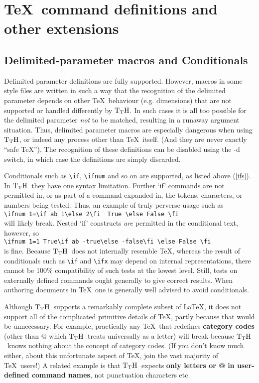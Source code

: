 \documentclass[12pt]{article}
\def\TtH{$\rm{}T_TH$}
\begin{document}
\section{\TeX\ command definitions and other extensions}

\subsection{Delimited-parameter macros and
Conditionals}

Delimited parameter definitions are fully supported. However, macros
in some style files are written in such a way that the recognition of
the delimited parameter depends on other \TeX\ behaviour
(e.g. dimensions) that are not supported or handled differently by
\TtH. In such cases it is all too possible for the delimited parameter
\emph{not} to be matched, resulting in a runaway argument situation.
Thus, delimited parameter macros are especially dangerous when using
\TtH, or indeed any process other than \TeX\ itself. (And they are
never exactly ``safe \TeX''). The recognition of these definitions can
be disabled using the -d switch, in which case the definitions are
simply discarded.

Conditionals such as \verb|\if|, \verb|\ifnum| and so on are
supported, as listed above (\ref{ifs}). In \TtH\ they have one
syntax limitation. Further `if' commands are not permitted in, or as part of
a command expanded in, the tokens, characters, or numbers being
tested. Thus, an example of truly perverse usage such as\\
\verb|\ifnum 1=\if ab 1\else 2\fi  True \else False \fi|\\ will likely
break. Nested `if' constructs \emph{are} permitted in the conditional
text, however, so\\ 
\verb|\ifnum 1=1 True\if ab -true\else -false\fi \else False \fi|\\ is fine.
Because \TtH\ does not internally resemble \TeX, whereas the result of
conditionals such as \verb|\if| and \verb|\ifx| may depend on internal
representations, there cannot be 100\% compatibility of such tests at
the lowest level. Still, tests on externally defined commands ought
generally to give correct results. When authoring documents in \TeX\ one
is generally well advised to avoid conditionals.


Although \TtH\ supports a remarkably complete subset of \LaTeX, it does
not support all of the complicated primitive details of
\TeX, partly because that would be unnecessary. 
For example, practically any \TeX\ that redefines {\bf category codes}
(other than @ which \TtH\ treats universally as a letter) will break because
\TtH\ knows nothing about the concept of category codes. (If you don't
know much either, about this unfortunate aspect of \TeX, join the vast
majority of \TeX\ users!)  A related example is that \TtH\ expects {\bf
only letters or @ in user-defined command names}, not punctuation
characters etc.
\end{document}
